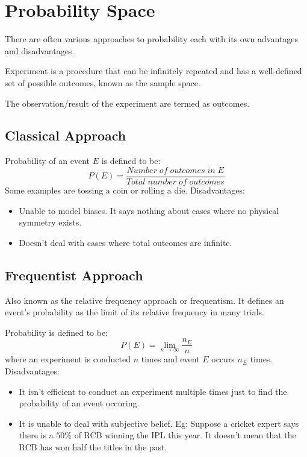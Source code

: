 \documentclass{article}
\begin{document}
\section{Probability Space}
There are often various approaches to probability each with its own advantages
and disadvantages.

Experiment is a procedure that can be infinitely repeated and has a
well-defined set of possible outcomes, known as the sample space.

The observation/result of the experiment are termed as outcomes.

\subsection{Classical Approach}
        Probability of an event $E$ is defined to be: $$P(E)=\frac{Number\; of\;
         outcomes\;in\; E}{Total\; number\; of\; outcomes}$$
         Some examples are tossing a coin or rolling a die.
         Disadvantages:
         \begin{itemize}
             \item Unable to model biases. It says nothing about cases where no
             physical symmetry exists.
             \item Doesn't deal with cases where total outcomes are infinite.
         \end{itemize}

         \subsection{Frequentist Approach}
         Also known as the relative frequency approach or frequentism. It defines
         an event's probability as the limit of its relative frequency in many
         trials.

         Probability is defined to be:
         $$ P(E)=\lim_{n \to \infty} \frac{n_E}{n}$$
         where an experiment is conducted $n$ times and event $E$ occurs $n_E$
         times.
         Disadvantages:
         \begin{itemize}
             \item It isn't efficient to conduct an experiment multiple times
             just to find the probability of an event occuring.
             \item It is unable to deal with subjective belief. Eg: Suppose a
             cricket expert says there is a $50\%$ of RCB winning the IPL this
             year. It doesn't mean that the RCB has won half the titles in the
             past.
         \end{itemize}
%
\end{document}
